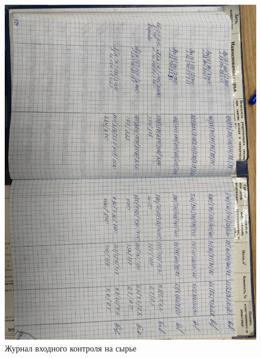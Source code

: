 \begin{figure}
\begin{center}
 \includegraphics[height=0.9\textheight, angle=180, keepaspectratio]{Pics/VIII анализы сырья.jpg}
\end{center}
 \caption{Журнал входного контроля на сырье}
 \label{pic:/VIII анализы сырья}
\end{figure}




